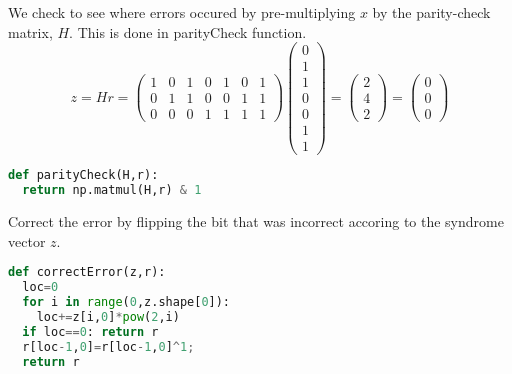 \documentclass[12pt]{article}
\begin{document}
We check to see where errors occured by pre-multiplying $x$ by the parity-check matrix, $H$. 
This is done in parityCheck function.
\[
  z = Hr = 
  \begin{pmatrix}
    1 & 0 & 1 & 0 & 1 & 0 & 1 \\
    0 & 1 & 1 & 0 & 0 & 1 & 1 \\
    0 & 0 & 0 & 1 & 1 & 1 & 1 
  \end{pmatrix}
  \begin{pmatrix}
    0 \\
    1 \\
    1 \\
    0 \\
    0 \\
    1 \\
    1
  \end{pmatrix} 
  =
  \begin{pmatrix}
    2 \\
    4 \\
    2
  \end{pmatrix} 
  =
  \begin{pmatrix}
    0 \\
    0 \\
    0
  \end{pmatrix}
\]
\begin{lstlisting}[frame=single,language=Python,caption=parityCheck \label{code:makeMessage}]
def parityCheck(H,r): 
  return np.matmul(H,r) & 1
\end{lstlisting}

Correct the error by flipping the bit that was incorrect accoring to the syndrome vector $z$.
\begin{lstlisting}[frame=single,language=Python,caption=correctError \label{code:makeMessage}]
def correctError(z,r): 
  loc=0
  for i in range(0,z.shape[0]):
    loc+=z[i,0]*pow(2,i)
  if loc==0: return r
  r[loc-1,0]=r[loc-1,0]^1;
  return r
\end{lstlisting}
\end{document}
